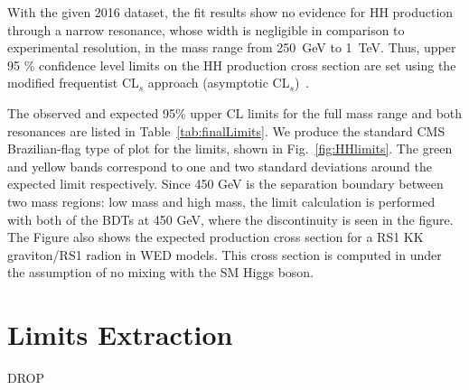 With the given 2016 dataset, the fit results show no evidence for HH production through a narrow
resonance, whose width is negligible in comparison to experimental
resolution, in the mass range from 250~GeV to 1~TeV. Thus, upper 95 \% confidence level limits on the
HH production cross section are set using the modified
frequentist CL$_s$ approach (asymptotic CL$_s$)~\cite{Junk:1999kv,LEP-CLs, HIG-11-011, Cowan:2010js}.

The observed and expected 95\% upper CL limits for the full mass range
and both resonances are listed in Table~\ref{tab:finalLimits}. We produce the standard CMS Brazilian-flag type of plot for the limits, shown in Fig.~\ref{fig:HHlimits}. The green and yellow
bands correspond to one and two standard deviations around
the expected limit respectively. Since 450 GeV is the separation boundary between two mass regions: low mass and high mass, the limit calculation is performed with both of the BDTs at 450 GeV, where the discontinuity is
seen in the figure. The Figure also shows the expected production
cross section for a RS1 KK graviton/RS1 radion in WED models. %
This cross section is computed in \cite{Oliveira:2014kla}
under the assumption of no mixing with the SM Higgs boson.











\section{Limits Extraction}
DROP

\label{sec:limits}

